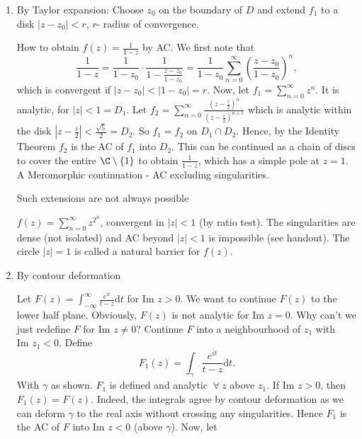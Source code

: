\documentclass[a4paper]{article}
\begin{document}
\begin{enumerate}
    \item By Taylor expansion: Choose $z_0$ on the boundary of $D$ and extend  $f_1$ to a disk $| z - z_0| < r$, $r$- radius of convergence. 
        \begin{eg}
            How to obtain $f(z) = \frac{1}{1 - z}$ by AC. We first note that
            \[
                \frac{1}{1 -z} = \frac{1}{1 - z_0} \cdot \frac{1}{ 1 - \frac{z - z_0}{ 1 - z_0}} = \frac{1}{1 - z_0} \sum_{n = 0}^{\infty} \left( \frac{z - z_0}{ 1 - z_0} \right)^{n} 
            ,\] 
            which is convergent if $|z - z_0| < |1 - z_0| = r$. Now, let $f_1  = \sum_{n =0}^{\infty}z^{n}$. It is analytic, for $|z| < 1 = D_1$. Let $f_2 = \sum_{n = 0}^{\infty} \frac{( z - \frac{i}{2})^{n}}{ (z - \frac{i}{2})^{n + 1}}$ which is analytic within the disk $|z - \frac{i}{2}| < \frac{\sqrt{5} }{2} = D_2$. So $f_{1} = f_2$ on $D_1 \cap D_2$. Hence, by the Identity Theorem $f_2$ is the AC of  $f_1$ into $D_2$. This can be continued as a chain of discs to cover the entire $\C \setminus \{ 1\} $ to obtain $\frac{1}{1 - z}$, which has a simple pole at $z = 1$. A Meromorphic continuation - AC excluding singularities. 
        \end{eg}
        Such extensions are not always possible
        \begin{eg}
            $f(z) = \sum_{n =0}^{\infty} z^{ 2 ^{n}}$, convergent in $|z| < 1$ (by ratio test). The singularities are dense (not isolated) and AC beyond $|z| < 1$ is impossible (see handout). The circle $|z|  = 1$ is called a natural barrier for $f(z)$.
        \end{eg}
    \item By contour deformation 
        \begin{eg}
            Let $F(z) = \int_{- \infty}^\infty \frac{e^{ i t}}{ t  - z} \text{d}t$ for $\text{Im } z > 0$. We want to continue $F(z)$ to the lower half plane. Obviously, $F(z)$ is not analytic for $\text{Im } z = 0 $. Why can't we just redefine $F$ for $\text{Im } z \ne 0$? Continue $F$ into a neighbourhood of $z_1$ with $\text{Im } z_1 < 0$. Define
            \[
                F_{1}(z) = \int_\gamma \frac{e^{ i t}}{ t - z}\text{d}t
            .\] 
            With $\gamma$ as shown. $F_1$ is defined and analytic $\ \forall \  z $  above $z_1$. If $\text{Im } z > 0$, then $F_1(z) = F(z)$. Indeed, the integrals agree by contour deformation as we can deform $\gamma$ to the real axis without crossing any singularities. Hence $F_1$ is the AC of  $F$ into $\text{Im } z < 0$ (above $\gamma$). Now, let 

\end{eg}
\end{enumerate}
\end{document}
